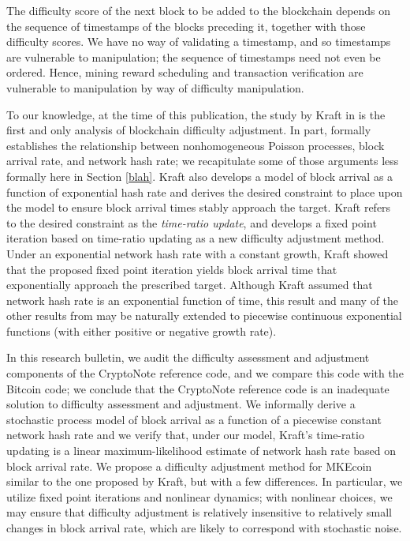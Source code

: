 \documentclass[12pt,english]{mrl}
\theoremstyle{definition}
\numberwithin{equation}{section}
\numberwithin{figure}{section}
\numberwithin{equation}{section}
\numberwithin{equation}{section}
\numberwithin{figure}{section}
\begin{document}
The difficulty score of the next block to be added to the blockchain depends on the sequence of timestamps of the blocks preceding it, together with those difficulty scores.  We have no way of validating a timestamp, and so timestamps are vulnerable to manipulation; the sequence of timestamps need not even be ordered. Hence, mining reward scheduling and transaction verification are vulnerable to manipulation by way of difficulty manipulation.  

To our knowledge, at the time of this publication, the study by Kraft in \cite{kraft2015difficulty} is the first and only analysis of blockchain difficulty adjustment. In part, \cite{kraft2015difficulty} formally establishes the relationship between nonhomogeneous Poisson processes, block arrival rate, and network hash rate; we recapitulate some of those arguments less formally here in Section \ref{blah}.  Kraft also develops a model of block arrival as a function of exponential hash rate and derives the desired constraint to place upon the model to ensure block arrival times stably approach the target. Kraft refers to the desired constraint as the \textit{time-ratio update}, and develops a fixed point iteration based on time-ratio updating as a new difficulty adjustment method. Under an exponential network hash rate with a constant growth, Kraft showed that the proposed fixed point iteration yields block arrival time that exponentially approach the prescribed target. Although Kraft assumed that network hash rate is an exponential function of time, this result and many of the other results from \cite{kraft2015difficulty} may be naturally extended to piecewise continuous exponential functions (with either positive or negative growth rate).

In this research bulletin, we audit the difficulty assessment and adjustment components of the CryptoNote reference code, and we compare this code with the Bitcoin code; we conclude that the CryptoNote reference code is an inadequate solution to difficulty assessment and adjustment. We informally derive a stochastic process model of block arrival as a function of a piecewise constant network hash rate and we verify that, under our model, Kraft's time-ratio updating is a linear maximum-likelihood estimate of network hash rate based on block arrival rate. We propose a difficulty adjustment method for MKEcoin similar to the one proposed by Kraft, but with a few differences. In particular, we utilize fixed point iterations and nonlinear dynamics; with nonlinear choices, we may ensure that difficulty adjustment is relatively insensitive to relatively small changes in block arrival rate, which are likely to correspond with stochastic noise.  
\end{document}
